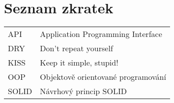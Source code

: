\section*{Seznam zkratek}
\vspace{2em}

\noindent
\begin{tabular}{@{}ll@{}}
API	  &	Application Programming Interface\\
DRY	  &	Don't repeat yourself\\
KISS	&	Keep it simple, stupid!\\
OOP	  &	Objektově orientované programování\\
SOLID	&	Návrhový princip SOLID 
\end{tabular}

